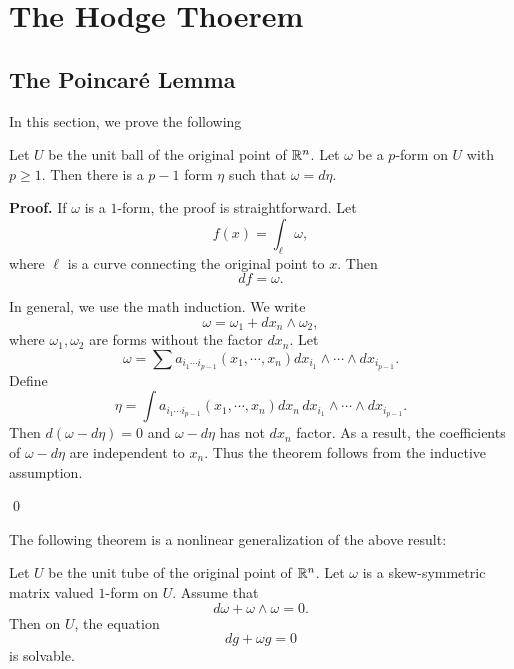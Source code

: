 

\chapter{The Hodge Thoerem}

\section{The Poincar\'e Lemma}
In this section, we prove the following

\begin{theorem} Let $U$ be the unit ball of the original point of $\mathbb R^n$. Let $\omega$ be a $p$-form on $U$ with $p\geq 1$. Then there is a $p-1$ form $\eta$ such that $\omega=d\eta$.
\end{theorem}

{\bf Proof.} 
If $\omega$ is a $1$-form, the proof is straightforward. Let 
\[
f(x)=\int_{\ell}\omega,
\]
where $\ell$ is a curve connecting the original point to $x$. Then
\[
df=\omega.
\]

In general, we use the math induction. We write
\[
\omega=\omega_1+dx_n\wedge\omega_2,
\]
where $\omega_1,\omega_2$ are forms without the factor $dx_n$. Let
\[
\omega=\sum a_{i_1\cdots i_{p-1}}(x_1,\cdots,x_n)dx_{i_1}\wedge\cdots\wedge dx_{i_{p-1}}.
\]
Define
\[
\eta=\int a_{i_1\cdots i_{p-1}}(x_1,\cdots,x_n)dx_n\, dx_{i_1}\wedge\cdots\wedge dx_{i_{p-1}}.
\]
Then $d(\omega-d\eta)=0$ and $\omega-d\eta$ has not $dx_n$ factor. As a result, the coefficients of $\omega-d\eta$ are independent to $x_n$. Thus the theorem follows from the inductive assumption.

\qed

The following theorem is a nonlinear generalization of the above result:

\begin{theorem} 
Let $U$ be the unit tube of the original point of $\mathbb R^n$.
Let $\omega$ is a skew-symmetric matrix valued $1$-form on $U$. Assume that
\[
d\omega+\omega\wedge\omega=0.
\]
Then on $U$, the equation
\[
dg+\omega g=0
\]
is solvable.
\end{theorem}

